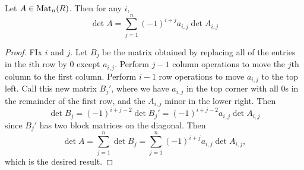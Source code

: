 \begin{prop}
  Let $A \in \operatorname{Mat}_n(R)$. Then for any $i$,
  \[
    \det A = \sum_{j = 1}^n (-1)^{i + j} a_{i, j} \det A_{i, j}
  \]
\end{prop}

\begin{proof}
  FIx $i$ and $j$. Let $B_j$ be the matrix obtained by
  replacing all of the entries in the $i$th row
  by $0$ except $a_{i, j}$. Perform $j - 1$ column
  operations to move the $j$th column to the first
  column. Perform $i - 1$ row operations to move
  $a_{i, j}$ to the top left. Call this new matrix
  $B_j'$, where we have $a_{i, j}$ in the top corner
  with all $0$s in the remainder of the first row,
  and the $A_{i, j}$ minor in the lower right. Then
  \[
    \det B_j = (-1)^{i + j - 2} \det B_j'
    = (-1)^{i + j - 2} a_{i, j} \det A_{i, j}
  \]
  since $B_j'$ has two block matrices on the diagonal.
  Then
  \[
    \det A = \sum_{j = 1}^n \det B_j
    = \sum_{j = 1}^n (-1)^{i + j} a_{i, j} \det A_{i, j},
  \]
  which is the desired result.
\end{proof}
